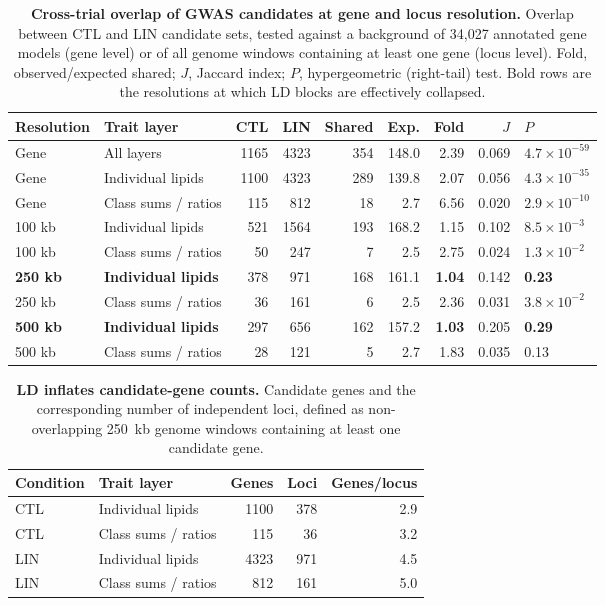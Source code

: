 \begin{table}[!ht]
\centering
\caption{\textbf{Cross-trial overlap of GWAS candidates at gene and locus resolution.} Overlap between CTL and LIN candidate sets, tested against a background of 34{,}027 annotated gene models (gene level) or of all genome windows containing at least one gene (locus level). Fold, observed/expected shared; $J$, Jaccard index; $P$, hypergeometric (right-tail) test. Bold rows are the resolutions at which LD blocks are effectively collapsed.}
\label{tab:overlap}
\small
\begin{tabular}{llrrrrrrl}
\toprule
\textbf{Resolution} & \textbf{Trait layer} & \textbf{CTL} & \textbf{LIN} & \textbf{Shared} & \textbf{Exp.} & \textbf{Fold} & \textbf{$J$} & \textbf{$P$} \\
\midrule
Gene   & All layers          & 1165 & 4323 & 354 & 148.0 & 2.39 & 0.069 & $4.7\times10^{-59}$ \\
Gene   & Individual lipids   & 1100 & 4323 & 289 & 139.8 & 2.07 & 0.056 & $4.3\times10^{-35}$ \\
Gene   & Class sums / ratios &  115 &  812 &  18 &   2.7 & 6.56 & 0.020 & $2.9\times10^{-10}$ \\
\midrule
100 kb & Individual lipids   &  521 & 1564 & 193 & 168.2 & 1.15 & 0.102 & $8.5\times10^{-3}$ \\
100 kb & Class sums / ratios &   50 &  247 &   7 &   2.5 & 2.75 & 0.024 & $1.3\times10^{-2}$ \\
\textbf{250 kb} & \textbf{Individual lipids}   & 378 & 971 & 168 & 161.1 & \textbf{1.04} & 0.142 & \textbf{0.23} \\
250 kb & Class sums / ratios &   36 &  161 &   6 &   2.5 & 2.36 & 0.031 & $3.8\times10^{-2}$ \\
\textbf{500 kb} & \textbf{Individual lipids}   & 297 & 656 & 162 & 157.2 & \textbf{1.03} & 0.205 & \textbf{0.29} \\
500 kb & Class sums / ratios &   28 &  121 &   5 &   2.7 & 1.83 & 0.035 & 0.13 \\
\bottomrule
\end{tabular}
\end{table}

\begin{table}[!ht]
\centering
\caption{\textbf{LD inflates candidate-gene counts.} Candidate genes and the corresponding number of independent loci, defined as non-overlapping 250~kb genome windows containing at least one candidate gene.}
\label{tab:inflation}
\small
\begin{tabular}{llrrr}
\toprule
\textbf{Condition} & \textbf{Trait layer} & \textbf{Genes} & \textbf{Loci} & \textbf{Genes/locus} \\
\midrule
CTL & Individual lipids   & 1100 & 378 & 2.9 \\
CTL & Class sums / ratios &  115 &  36 & 3.2 \\
LIN & Individual lipids   & 4323 & 971 & 4.5 \\
LIN & Class sums / ratios &  812 & 161 & 5.0 \\
\bottomrule
\end{tabular}
\end{table}

